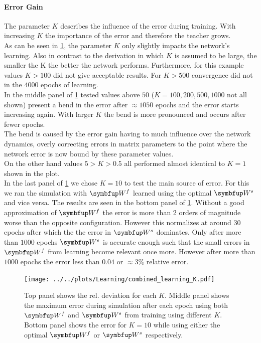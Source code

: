 \paragraph{Error Gain}
The parameter $K$ describes the influence of the error during training. With increasing $K$ the importance of the error and therefore the teacher grows.\\
As can be seen in \cref{fig:combined_learning_K}, the parameter $K$ only slightly impacts the network's learning. Also in contrast to the derivation in which $K$ is assumed to be large, the smaller the K the better the network performs. Furthermore, for this example values $K>100$ did not give acceptable results. For $K>500$ convergence did not in the $4000$ epochs of learning.\\
In the middle panel of \cref{fig:combined_learning_K} tested values above $50$ ($K = 100, 200,500,1000$ not all shown) present a bend in the error after $\approx 1050$ epochs and the error starts increasing again. With larger $K$ the bend is more pronounced and occurs after fewer epochs.\\
The bend is caused by the error gain having to much influence over the network dynamics, overly correcting errors in matrix parameters to the point where the network error is now bound by these parameter values.\\
On the other hand values $5>K>0.5$ all performed almost identical to $K=1$ shown in the plot.\\
In the last panel of \cref{fig:combined_learning_K} we chose $K=10$ to test the main source of error. For this we ran the simulation with $\bmu{W}^f$ learned using the optimal $\bmu{W}^s$ and vice versa. The results are seen in the bottom panel of \cref{fig:combined_learning_K}. Without a good approximation of $\bmu{W}^f$ the error is more than 2 orders of magnitude worse than the opposite configuration. However this normalizes at around $30$ epochs after which the the error in $\bmu{W}^s$ dominates. Only after more than $1000$ epochs $\bmu{W}^s$ is accurate enough such that the small errors in $\bmu{W}^f$ from learning become relevant once more. However after more than $1000$ epochs the error less than $0.04$ or $\approx 3\%$ relative error.\\
\begin{figure}
	\centering
	\texttt{[image: ../../plots/Learning/combined\_learning\_K.pdf]}
	\caption{Top panel shows the rel. deviation for each $K$. Middle panel shows the maximum error during simulation after each epoch using both $\bmu{W}^f$ and $\bmu{W}^s$ from training using different $K$. Bottom panel shows the error for $K = 10$ while using either the optimal $\bmu{W}^f$ or $\bmu{W}^s$ respectively.}
	\label{fig:combined_learning_K}
\end{figure}

